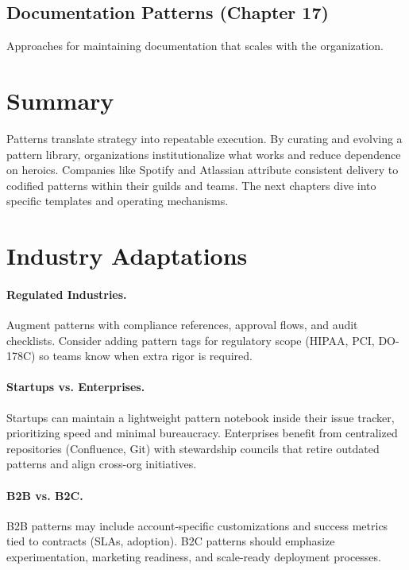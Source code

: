 \subsection{Documentation Patterns (Chapter 17)}
Approaches for maintaining documentation that scales with the organization.

\section{Summary}
\label{sec:implementation-summary}

Patterns translate strategy into repeatable execution. By curating and evolving a pattern library, organizations institutionalize what works and reduce dependence on heroics. Companies like Spotify and Atlassian attribute consistent delivery to codified patterns within their guilds and teams. The next chapters dive into specific templates and operating mechanisms.

\section{Industry Adaptations}
\label{sec:implementation-industry}
\paragraph{Regulated Industries.} Augment patterns with compliance references, approval flows, and audit checklists. Consider adding pattern tags for regulatory scope (HIPAA, PCI, DO-178C) so teams know when extra rigor is required.

\paragraph{Startups vs. Enterprises.} Startups can maintain a lightweight pattern notebook inside their issue tracker, prioritizing speed and minimal bureaucracy. Enterprises benefit from centralized repositories (Confluence, Git) with stewardship councils that retire outdated patterns and align cross-org initiatives.

\paragraph{B2B vs. B2C.} B2B patterns may include account-specific customizations and success metrics tied to contracts (SLAs, adoption). B2C patterns should emphasize experimentation, marketing readiness, and scale-ready deployment processes.

